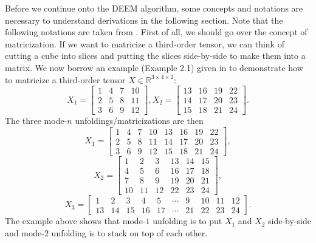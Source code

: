 \documentclass[11pt]{article}
\begin{document}
Before we continue onto the DEEM algorithm, some concepts and notations are necessary to understand derivations in the following section. Note that the following notations are taken from \cite{kolda2009review}. First of all, we should go over the concept of matricization. If we want to matricize a third-order tensor, we can think of cutting a cube into slices and putting the slices side-by-side to make them into a matrix. We now borrow an example (Example 2.1) given in \cite{kolda2009review} to demonstrate how to matricize a third-order tensor $X \in \mathbb{R}^{3\times 4 \times 2}$: 
\begin{equation*}
    X_1 = \begin{bmatrix}
        1 & 4 & 7 & 10 \\ 2 & 5 & 8 & 11 \\ 3 & 6 & 9 & 12 
    \end{bmatrix}, 
    X_2 = \begin{bmatrix} 13 & 16 & 19 & 22 \\ 14 & 17 & 20 & 23 \\ 15 & 18 & 21 & 24  \end{bmatrix}.    
\end{equation*}
The three mode-$n$ unfoldings/matricizations are then
\begin{equation*}
    X_1 = \begin{bmatrix}
        1 & 4 & 7 & 10 & 13 & 16 & 19 & 22 \\ 2 & 5 & 8 & 11 & 14 & 17 & 20 & 23 \\ 3 & 6 & 9 & 12 & 15 & 18 & 21 & 24
    \end{bmatrix},
\end{equation*}
\begin{equation*}
    X_2 = \begin{bmatrix}
        1 & 2 & 3 & 13 & 14 & 15 \\ 4 & 5 & 6 & 16 & 17 & 18 \\ 7 & 8 & 9 & 19 & 20 & 21 \\ 10 & 11 & 12 & 22 & 23  & 24
    \end{bmatrix},
\end{equation*}
\begin{equation*}
    X_3 = \begin{bmatrix}
        1 & 2 & 3 & 4 & 5 & \cdots & 9 & 10 & 11 & 12 \\ 13 & 14 & 15 & 16 & 17 & \cdots & 21 & 22 & 23 & 24 
    \end{bmatrix}.
\end{equation*}
The example above shows that mode-$1$ unfolding is to put $X_1$ and $X_2$ side-by-side and mode-$2$ unfolding is to stack on top of each other. 
\end{document}
